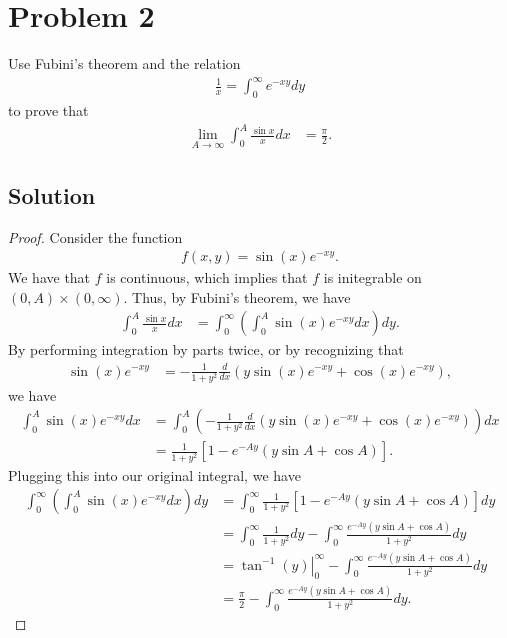 \documentclass[10pt,a4paper]{article}
\theoremstyle{theorem}
\theoremstyle{definition}
\begin{document}
\section*{Problem 2}
Use Fubini's theorem and the relation 
\begin{align*}
\frac{1}{x} = \int_0^\infty e^{-xy} dy
\end{align*}
to prove that 
\begin{align*}
\lim_{A \to \infty} \int_0^A \frac{\sin x}{x}dx &= \frac{\pi}{2}.
\end{align*}

\subsection*{Solution}
\begin{proof}
Consider the function 
\begin{align*}
f(x, y) = \sin (x) e^{-xy}. 
\end{align*}
We have that $f$ is continuous, which implies that $f$ is initegrable on $(0, A) \times (0, \infty)$. Thus, by Fubini's theorem, we have
\begin{align*}
\int_0^A \frac{\sin x}{x}dx &= \int_0^\infty \left( \int_0^A\sin (x) e^{-xy}  dx \right) dy.
\end{align*}
By performing integration by parts twice, or by recognizing that 
\begin{align*}
\sin (x) e^{-xy} &= - \frac{1}{1 + y^2} \frac{d}{dx} (y \sin (x) e^{-xy} + \cos (x) e^{-xy}),
\end{align*}
we have
\begin{align*}
\int_0^A\sin (x) e^{-xy}  dx &= \int_0^A \left(- \frac{1}{1 + y^2} \frac{d}{dx} (y \sin (x) e^{-xy} + \cos (x) e^{-xy}) \right)dx\\
&= \frac{1}{1 + y^2} [1 - e^{-Ay}(y \sin A + \cos A)].
\end{align*}
Plugging this into our original integral, we have
\begin{align*}
\int_0^\infty \left( \int_0^A\sin (x) e^{-xy}  dx \right) dy &= \int_0^\infty \frac{1}{1 + y^2} [1 - e^{-Ay}(y \sin A + \cos A)] dy\\
&= \int_0^\infty \frac{1}{1 + y^2}dy  - \int_0^\infty \frac{e^{-Ay}(y \sin A + \cos A)}{1 + y^2} dy\\
&= \left. \tan^{-1} (y) \right|_0^\infty - \int_0^\infty \frac{e^{-Ay}(y \sin A + \cos A)}{1 + y^2} dy\\
&= \frac{\pi}{2} - \int_0^\infty \frac{e^{-Ay}(y \sin A + \cos A)}{1 + y^2} dy.
\end{align*}

\end{proof}
\end{document}
